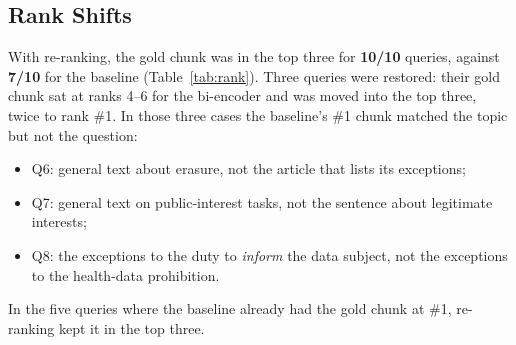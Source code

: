 \documentclass[10pt,a4paper]{article}
\begin{document}
\subsection{Rank Shifts}
With re-ranking, the gold chunk was in the top three for \textbf{10/10} queries, against
\textbf{7/10} for the baseline (Table~\ref{tab:rank}). Three queries were restored: their gold
chunk sat at ranks 4--6 for the bi-encoder and was moved into the top three, twice to rank
\#1. In those three cases the baseline's \#1 chunk matched the topic but not the question:
\begin{itemize}
  \item Q6: general text about erasure, not the article that lists its exceptions;
  \item Q7: general text on public-interest tasks, not the sentence about legitimate interests;
  \item Q8: the exceptions to the duty to \emph{inform} the data subject, not the exceptions to the health-data prohibition.
\end{itemize}
In the five queries where the baseline already had the gold chunk at \#1, re-ranking kept it in
the top three.
\end{document}
